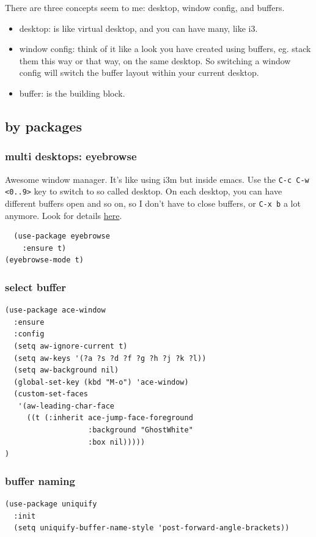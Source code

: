 \documentclass[11pt]{article}
\begin{document}
There are three concepts seem to me: desktop, window config, and buffers.

\begin{itemize}
\item desktop: is like virtual desktop, and you can have many, like i3.
\item window config: think of it like a look you have created using
buffers, eg. stack them this way or that way, on the same
desktop. So switching a window config will switch the buffer layout
within your current desktop.
\item buffer: is the building block.
\end{itemize}

\subsection{by packages}
\label{sec:orgca4ae00}
\subsubsection{multi desktops: eyebrowse}
\label{sec:org6894401}

Awesome window manager. It's like using i3m but inside emacs. Use the
\texttt{C-c C-w <0..9>} key to switch to so called desktop. On each desktop,
you can have different buffers open and so on, so I don't have to
close buffers, or \texttt{C-x b} a lot anymore. Look for details \href{https://depp.brause.cc/eyebrowse/}{here}.

\begin{verbatim}
  (use-package eyebrowse
    :ensure t)
(eyebrowse-mode t)
\end{verbatim}

\subsubsection{select buffer}
\label{sec:orgc69d81c}

\begin{verbatim}
(use-package ace-window
  :ensure
  :config
  (setq aw-ignore-current t)
  (setq aw-keys '(?a ?s ?d ?f ?g ?h ?j ?k ?l))
  (setq aw-background nil)
  (global-set-key (kbd "M-o") 'ace-window)
  (custom-set-faces
   '(aw-leading-char-face
     ((t (:inherit ace-jump-face-foreground
                   :background "GhostWhite"
                   :box nil)))))
)
\end{verbatim}

\subsubsection{buffer naming}
\label{sec:org480792e}
\begin{verbatim}
(use-package uniquify
  :init
  (setq uniquify-buffer-name-style 'post-forward-angle-brackets))
\end{verbatim}
\end{document}
